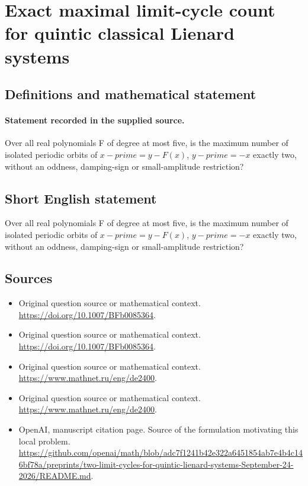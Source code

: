 \documentclass[11pt]{article}
\begin{document}
\section*{Exact maximal limit-cycle count for quintic classical Lienard systems}\label{statement}
\subsection{Definitions and mathematical statement}
\paragraph{Statement recorded in the supplied source.}
Over all real polynomials F of degree at most five, is the maximum number of isolated periodic orbits of $x-prime=y-F(x)$, $y-prime=-x$ exactly two, without an oddness, damping-sign or small-amplitude restriction?
\subsection{Short English statement}
Over all real polynomials F of degree at most five, is the maximum number of isolated periodic orbits of $x-prime=y-F(x)$, $y-prime=-x$ exactly two, without an oddness, damping-sign or small-amplitude restriction?
\subsection{Sources}
\begin{itemize}
\item[S1] Original question source or mathematical context.
\url{https://doi.org/10.1007/BFb0085364}.
\item[S2] Original question source or mathematical context.
\url{https://doi.org/10.1007/BFb0085364}.
\item[S3] Original question source or mathematical context.
\url{https://www.mathnet.ru/eng/de2400}.
\item[S4] Original question source or mathematical context.
\url{https://www.mathnet.ru/eng/de2400}.
\item[S5] OpenAI, manuscript citation page. Source of the formulation motivating this local problem.
\url{https://github.com/openai/math/blob/adc7f1241b42e322a6451854ab7e4b4c146bf78a/preprints/two-limit-cycles-for-quintic-lienard-systems-September-24-2026/README.md}.
\end{itemize}
\end{document}

